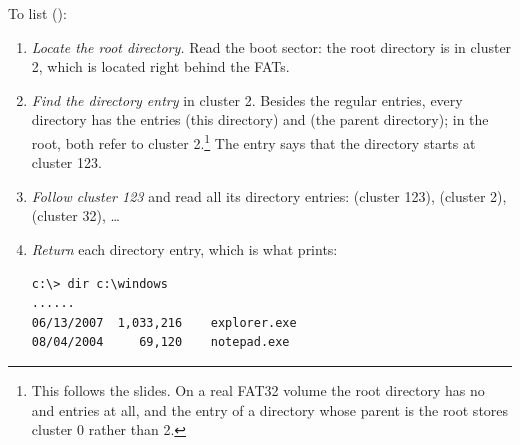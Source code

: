 To list  ():
\begin{enumerate}[beginpenalty=10000]
  \item \emph{Locate the root directory.} Read the boot sector: the root directory is in cluster 2, which is located right behind the FATs.
  \item \emph{Find the directory entry}  in cluster 2. Besides the regular entries, every directory has the entries  (this directory) and  (the parent directory); in the root, both refer to cluster 2.\footnote{This follows the slides. On a real FAT32 volume the root directory has no  and  entries at all, and the  entry of a directory whose parent is the root stores cluster 0 rather than 2.} The entry  says that the directory starts at cluster 123.
  \item \emph{Follow cluster 123} and read all its directory entries:  (cluster 123),  (cluster 2),  (cluster 32), \dots
  \item \emph{Return} each directory entry, which is what  prints:
\begin{lstlisting}[style=sh]
c:\> dir c:\windows
......
06/13/2007  1,033,216    explorer.exe
08/04/2004     69,120    notepad.exe
\end{lstlisting}
\end{enumerate}

